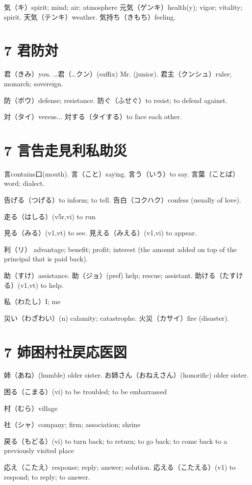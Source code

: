 気（キ）spirit; mind; air; atmosphere
元気（ゲンキ）health(y); vigor; vitality; spirit.
天気（テンキ）weather.
気持ち（きもち）feeling.

\section{7 君防対}

君（きみ）you.
…君（…クン）(suffix) Mr. (junior).
君主（クンシュ）ruler; monarch; sovereign.

防（ボウ）defense; resistance.
防ぐ（ふせぐ）to resist; to defend against.

対（タイ）versus...
対する（タイする）to face each other.

\section{7 言告走見利私助災}

言contains口(mouth).
言（こと）saying.
言う（いう）to say.
言葉（ことば）word; dialect.

告げる（つげる）to inform; to tell.
告白（コクハク）confess (usually of love).

走る（はしる）(v5r,vi) to run

見る（みる）(v1,vt) to see.
見える（みえる）(v1,vi) to appear.

利（リ）
advantage; benefit; profit;
interest (the amount added on top of the principal that is paid back).

助（すけ）assistance.
助（ジョ）(pref) help; rescue; assistant.
助ける（たすける）(v1,vt) to help.

私（わたし）I; me

災い（わざわい）(n) calamity; catastrophe.
火災（カサイ）fire (disaster).

\section{7 姉困村社戻応医図}

姉（あね）(humble) older sister.
お姉さん（おねえさん）(honorific) older sister.

困る（こまる）(vi) to be troubled; to be embarrassed

村（むら）village

社（シャ）company; firm; association; shrine

戻る（もどる）(vi) to turn back; to return; to go back;
to come back to a previously visited place

応え（こたえ）response; reply; answer; solution.
応える（こたえる）(v1) to respond; to reply; to answer.

